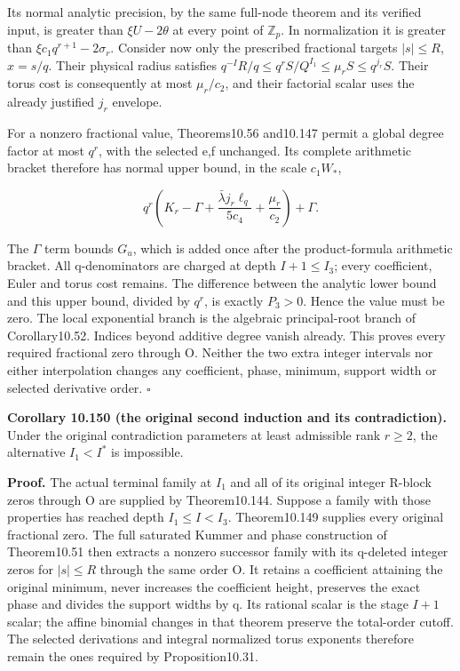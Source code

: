 \documentclass[
  11pt,
  a4paper,
]{article}
\begin{document}
Its normal analytic precision, by the same full-node theorem and its
verified input, is greater than \(\xi U-2\theta\) at every point of
\(\mathbb Z_p\). In normalization it is greater than
\(\xi c_1q^{r+1}-2\sigma_r\). Consider now only the prescribed
fractional targets \(|s|\le R\), \(x=s/q\). Their physical radius
satisfies \(q^{-I}R/q\le q^rS/Q^{I_1}\le\mu_rS\le q^{j_r}S\). Their
torus cost is consequently at most \(\mu_r/c_2\), and their factorial
scalar uses the already justified \(j_r\) envelope.

For a nonzero fractional value, Theorems10.56 and10.147 permit a global
degree factor at most \(q^r\), with the selected e,f unchanged. Its
complete arithmetic bracket therefore has normal upper bound, in the
scale \(c_1W_*\),

\[
q^r\left(K_r-\Gamma
 +\frac{\bar\lambda j_r\ell_q}{5c_4}+\frac{\mu_r}{c_2}\right)
 +\Gamma.
\tag{10.441}
\]

The \(\Gamma\) term bounds \(G_u\), which is added once after the
product-formula arithmetic bracket. All q-denominators are charged at
depth \(I+1\le I_3\); every coefficient, Euler and torus cost remains.
The difference between the analytic lower bound and this upper bound,
divided by \(q^r\), is exactly \(P_3>0\). Hence the value must be zero.
The local exponential branch is the algebraic principal-root branch of
Corollary10.52. Indices beyond additive degree vanish already. This
proves every required fractional zero through O. Neither the two extra
integer intervals nor either interpolation changes any coefficient,
phase, minimum, support width or selected derivative order. \(\square\)

\textbf{Corollary 10.150 (the original second induction and its
contradiction).} Under the original contradiction parameters at least
admissible rank \(r\ge2\), the alternative \(I_1<I^*\) is impossible.

\textbf{Proof.} The actual terminal family at \(I_1\) and all of its
original integer R-block zeros through O are supplied by Theorem10.144.
Suppose a family with those properties has reached depth
\(I_1\le I<I_3\). Theorem10.149 supplies every original fractional zero.
The full saturated Kummer and phase construction of Theorem10.51 then
extracts a nonzero successor family with its q-deleted integer zeros for
\(|s|\le R\) through the same order O. It retains a coefficient
attaining the original minimum, never increases the coefficient height,
preserves the exact phase and divides the support widths by q. Its
rational scalar is the stage \(I+1\) scalar; the affine binomial changes
in that theorem preserve the total-order cutoff. The selected
derivations and integral normalized torus exponents therefore remain the
ones required by Proposition10.31.
\end{document}
